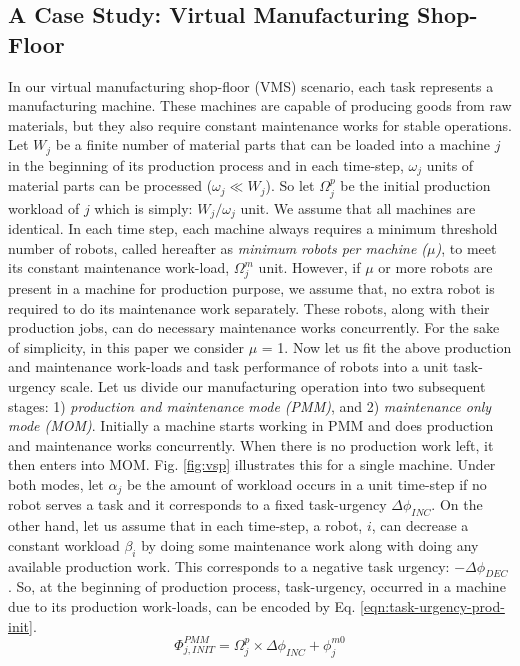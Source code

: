 \documentclass{llncs}
\begin{document}
\subsection{A Case Study: Virtual Manufacturing Shop-Floor}
\label{sec:afm:vms}
In our virtual manufacturing shop-floor (VMS) scenario, each task represents a manufacturing machine. These machines are capable of producing goods from raw materials, but they also require constant maintenance works for stable operations. Let $W_{j}$ be a finite number of material parts that can be loaded into a machine $j$ in the beginning of its production process and in each time-step, $\omega_{j}$ units of material parts can be processed  ($\omega_{j} \ll W_{j} $). So let $\Omega_{j}^{p}$ be the initial production workload of $j$ which is simply: $W_{j} / \omega_{j}$ unit. We assume that all machines are identical. In each time step, each machine always requires a minimum threshold number of robots, called hereafter as {\em minimum robots per machine ($\mu$)}, to meet its constant maintenance work-load, $\Omega_{j}^{m}$ unit. However, if $\mu$ or more robots are present in a machine for production purpose, we assume that, no extra robot is required to do its maintenance work separately. These robots, along with their production jobs, can do necessary maintenance works concurrently. For the sake of simplicity, in this paper we consider $\mu$ = 1.
Now let us fit the above production and maintenance work-loads and task performance of robots into a unit task-urgency scale. Let us divide our manufacturing operation into two subsequent stages: 1) {\em production and maintenance mode (PMM)}, and 2) {\em maintenance only mode (MOM)}. Initially a machine starts working in PMM and does production and maintenance works concurrently. When there is no production work left, it then enters into MOM. Fig. \ref{fig:vsp} illustrates this for a single machine.
Under both modes, let $\alpha_{j}$ be the amount of workload occurs in a unit time-step if no robot serves a task and it corresponds to a fixed task-urgency $\Delta \phi_{INC}$. On the other hand, let us assume that in each time-step, a robot, $i$, can decrease a constant workload $\beta_{i}$ by doing some maintenance work along with doing any available production work. This  corresponds to a negative task urgency: $- \Delta \phi_{DEC}$. 
So, at the beginning of production process, task-urgency, occurred in a machine due to its production work-loads, can be encoded by Eq. \ref{eqn:task-urgency-prod-init}.
\begin{equation}
\Phi_{j, INIT}^{PMM} = \Omega_{j}^{p} \times \Delta \phi_{INC} + \phi_{j}^{m0}
\label{eqn:task-urgency-prod-init}
\end{equation}
\end{document}
